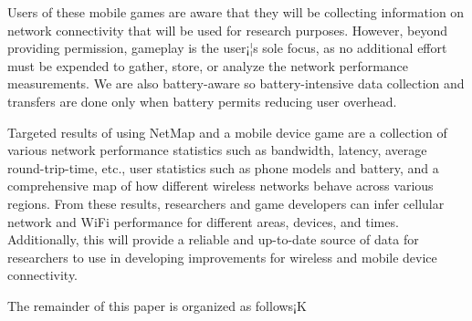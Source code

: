 Users of these mobile games are aware that they will be collecting information on network connectivity that will be used for research purposes. However, beyond providing permission, gameplay is the user¡¦s sole focus, as no additional effort must be expended to gather, store, or analyze the network performance measurements. We are also battery-aware so battery-intensive data collection and transfers are done only when battery permits reducing user overhead. 

Targeted results of using NetMap and a mobile device game are a collection of various network performance statistics such as bandwidth, latency, average round-trip-time, etc., user statistics such as phone models and battery, and a comprehensive map of how different wireless networks behave across various regions. From these results, researchers and game developers can infer cellular network and WiFi performance for different areas, devices, and times. Additionally, this will provide a reliable and up-to-date source of data for researchers to use in developing improvements for wireless and mobile device connectivity. 

The remainder of this paper is organized as follows¡K

